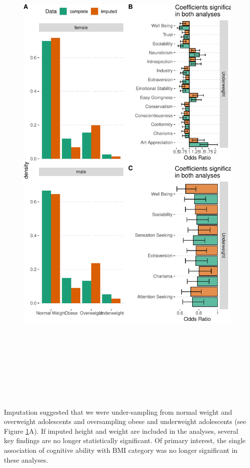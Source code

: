 \documentclass[man]{apa6}
\begin{document}
\begin{figure}
\includegraphics[height=10in]{bmi_personality_files/figure-latex/sens-1} \caption{ }\label{fig:sens}
\end{figure}

Imputation suggested that we were under-sampling from normal weight and overweight adolescents and oversampling obese and underweight adolescents (see Figure \ref{fig:sens}A). If imputed height and weight are included in the analyses, several key findings are no longer statistically significant. Of primary interest, the single association of cognitive ability with BMI category was no longer significant in these analyses.
\end{document}
